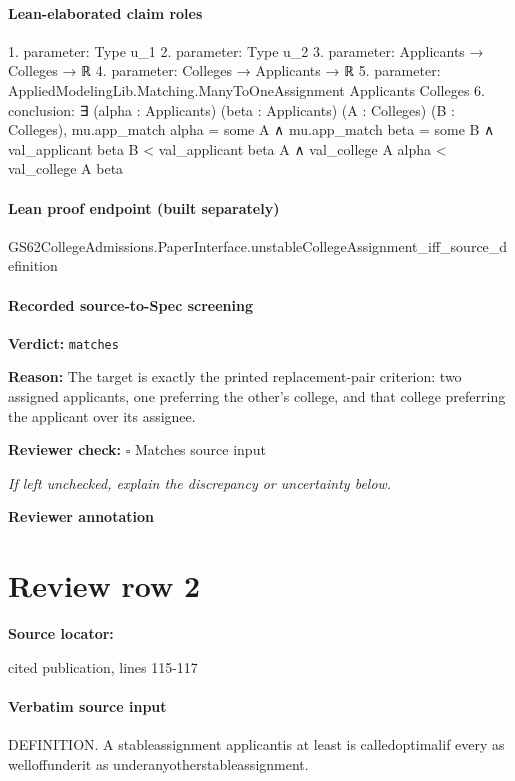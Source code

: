 \documentclass[10pt]{article}
\newcommand{\reviewerbox}{%
  \par\noindent\fbox{\parbox{0.96\linewidth}{\rule{0pt}{0.38in}}}\par
}
\newcommand{\reviewmatch}[1]{%
  \par\noindent\textbf{Reviewer check:} $\square$\; #1\par
  \noindent\emph{If left unchecked, explain the discrepancy or uncertainty below.}\par
}
\begin{document}
\paragraph{Lean-elaborated claim roles}\begin{ReviewVerbatim}
1. parameter: Type u_1
2. parameter: Type u_2
3. parameter: Applicants → Colleges → ℝ
4. parameter: Colleges → Applicants → ℝ
5. parameter: AppliedModelingLib.Matching.ManyToOneAssignment Applicants Colleges
6. conclusion: ∃ (alpha : Applicants) (beta : Applicants) (A : Colleges) (B : Colleges),
  mu.app_match alpha = some A ∧
    mu.app_match beta = some B ∧ val_applicant beta B < val_applicant beta A ∧ val_college A alpha < val_college A beta
\end{ReviewVerbatim}

\paragraph{Lean proof endpoint (built separately)}\begin{ReviewVerbatim}
GS62CollegeAdmissions.PaperInterface.unstableCollegeAssignment_iff_source_definition
\end{ReviewVerbatim}

\paragraph{Recorded source-to-Spec screening}
\textbf{Verdict:} \texttt{matches}
\\
{\raggedright
\textbf{Reason:} The target is exactly the printed replacement-\allowbreak{}pair criterion:\allowbreak{} two assigned applicants, one preferring the other's college, and that college preferring the applicant over its assignee.\allowbreak{}
\par}
\reviewmatch{Matches source input}
\noindent\textbf{Reviewer annotation}\par
\reviewerbox
\clearpage
\hypertarget{source-claim-bdf5e4a40e708c9e}{}
\section*{Review row 2}
\textbf{Source locator:} {\footnotesize\raggedright cited publication, lines 115-\allowbreak{}117\par}
\paragraph{Verbatim source input}
\begin{ReviewVerbatim}
DEFINITION. A stableassignment                      applicantis at least
                                is calledoptimalif every
as welloffunderit as underanyotherstableassignment.
\end{ReviewVerbatim}
\end{document}
